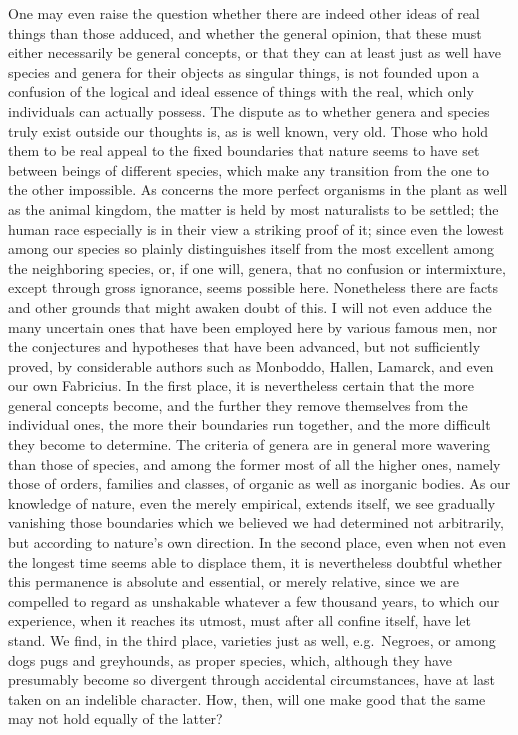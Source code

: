 \documentclass[12pt,a4paper,openany]{book}
\newcommand{\opage}[1]{\marginnote{\footnotesize\textit{[#1]}}}
\begin{document}
One may even raise the question whether there are indeed other ideas of real
things than those adduced, and whether the general opinion, that these must either
necessarily be general concepts, or that they can at least just as well have species
and genera for their objects as singular things, is not founded upon a confusion of
the logical and ideal essence of things with the real, which only individuals can
actually possess. The dispute as to whether genera and species truly exist outside
our thoughts is, as is well known, very old. Those who hold them to be real appeal
to the fixed boundaries that nature seems to have set between beings of different
species, which make any transition from the one to the other impossible. As
concerns the more perfect organisms in the plant as well as the animal kingdom,
the matter is held by most naturalists to be settled; the human race especially is
in their view a striking proof of it; since even the lowest among our species so
plainly distinguishes itself from the most excellent among the neighboring species,
or, if one will, genera, that no confusion or intermixture, except through gross
ignorance, seems possible here. Nonetheless there are facts and other grounds that
might awaken doubt of this. I will not even adduce the many uncertain ones that have
been
\setcounter{footnote}{0}%
\opage{105}employed here by various famous men, nor the conjectures and hypotheses that
have been advanced, but not sufficiently proved, by considerable authors such as
Monboddo, Hallen, Lamarck, and even our own Fabricius. In the first place, it is
nevertheless certain that the more general concepts become, and the further they
remove themselves from the individual ones, the more their boundaries run together,
and the more difficult they become to determine. The criteria of genera are in
general more wavering than those of species, and among the former most of all the
higher ones, namely those of orders, families and classes, of organic as well as
inorganic bodies. As our knowledge of nature, even the merely empirical, extends
itself, we see gradually vanishing those boundaries which we believed we had
determined not arbitrarily, but according to nature's own direction. In the second
place, even when not even the longest time seems able to displace them, it is
nevertheless doubtful whether this permanence is absolute and essential, or merely
relative, since we are compelled to regard as unshakable whatever a few thousand
years, to which our experience, when it reaches its utmost, must after all confine
itself, have let stand. We find, in the third place, varieties just as well, e.g.\
Negroes, or among dogs pugs and greyhounds, as proper species, which, although
they have presumably become so divergent through accidental circumstances, have at
last taken on an indelible character. How, then, will one make good that the same
may not hold equally of the latter?
\end{document}
